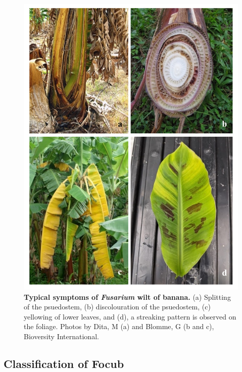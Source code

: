 \begin{figure}[pt!]
    \centering
    \includegraphics[width=15cm]{Figures/SymptomsofFoc.pdf}
    \caption[Typical symptoms of \textit{Fusarium}  wilt of banana.]{\textbf{Typical symptoms of \textit{Fusarium} wilt of banana.} (a) Splitting of the psuedostem, (b) discolouration of the psuedostem, (c) yellowing of lower leaves, and (d), a streaking pattern is observed on the foliage. Photos by Dita, M (a) and Blomme, G (b and c), Bioversity International.}
    \label{fig:FusariumWiltSymptoms}
\end{figure}

\subsection{Classification of \acl{Focub}}

